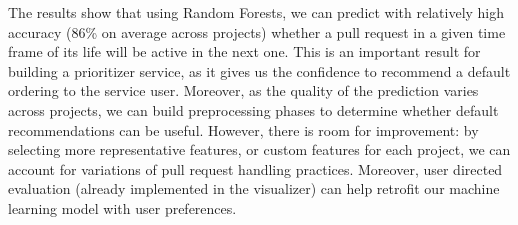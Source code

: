 \documentclass[conference]{IEEEtran}
\begin{document}
%

The results show that using Random Forests, we can predict with relatively high
accuracy (86\% on average across projects) whether a pull request in a given
time frame of its life will be active in the next one. This is an important
result for building a prioritizer service, as it gives us the confidence to
recommend a default ordering to the service user. Moreover, as the quality of
the prediction varies across projects, we can build preprocessing phases to
determine whether default recommendations can be useful.  However, there is room
for improvement: by selecting more representative features, or custom features
for each project, we can account for variations of pull request handling
practices. Moreover, user directed evaluation (already implemented in the
visualizer) can help retrofit our machine learning model with user preferences.
\end{document}
